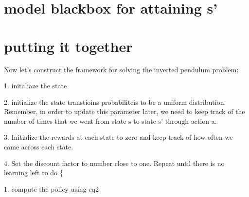 \documentclass[final,3p,times,twocolumn]{elsarticle}
\begin{document}
\section{model blackbox for attaining s'}

\section{putting it together}
Now let’s construct the framework for solving the inverted pendulum problem:\par
1. initaliaze the state\par
2. initialize the state transtioins probabiliteis to be a uniform distribution. Remember, in order to update this parameter later, we need to keep track of the number of times that we went from state s to state s’ through action a.\par
3. Initialize the rewards at each state to zero and keep track of how often we came across each state.\par
4. Set the discount factor to  number close to one.
Repeat until there is no learning left to do \{\par
1. compute the policy using eq2
\end{document}
